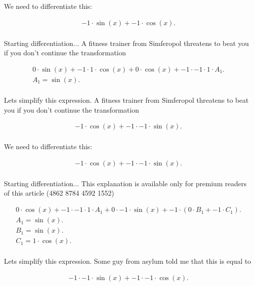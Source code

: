 \documentclass[12pt,a4paper]{extreport}
\begin{document}
We need to differentiate this:


\begin{multline}
-1 \cdot \sin(x) + -1 \cdot \cos(x).\\
\end{multline}


Starting differentiation... 
A fitness trainer from Simferopol\cite{SJ} threatens to beat you if you don't continue the transformation 

\begin{multline}
0 \cdot \sin(x) + -1 \cdot 1 \cdot \cos(x) + 0 \cdot \cos(x) + -1 \cdot -1 \cdot 1 \cdot A_{1}.\\
A_{1} = \sin(x).\\
\end{multline}


Lets simplify this expression.
A fitness trainer from Simferopol\cite{SJ} threatens to beat you if you don't continue the transformation 

\begin{multline}
-1 \cdot \cos(x) + -1 \cdot -1 \cdot \sin(x).\\
\end{multline}


We need to differentiate this:


\begin{multline}
-1 \cdot \cos(x) + -1 \cdot -1 \cdot \sin(x).\\
\end{multline}


Starting differentiation... 
This explanation is available only for premium readers of this article (4862 8784 4592 1552) 

\begin{multline}
0 \cdot \cos(x) + -1 \cdot -1 \cdot 1 \cdot A_{1} + 0 \cdot -1 \cdot \sin(x) + -1 \cdot (0 \cdot B_{1} + -1 \cdot C_{1}).\\
A_{1} = \sin(x).\\
B_{1} = \sin(x).\\
C_{1} = 1 \cdot \cos(x).\\
\end{multline}


Lets simplify this expression.
Some guy from asylum \cite{Anton} told me that this is equal to 

\begin{multline}
-1 \cdot -1 \cdot \sin(x) + -1 \cdot -1 \cdot \cos(x).\\
\end{multline}
\end{document}
